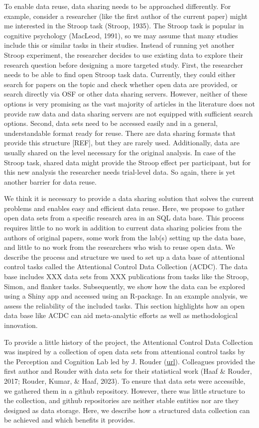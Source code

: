 \documentclass[
  man,floatsintext]{apa6}
\begin{document}
To enable data reuse, data sharing needs to be approached differently. For example, consider a researcher (like the first author of the current paper) might me interested in the Stroop task (Stroop, 1935). The Stroop task is popular in cognitive psychology (MacLeod, 1991), so we may assume that many studies include this or similar tasks in their studies. Instead of running yet another Stroop experiment, the researcher decides to use existing data to explore their research question before designing a more targeted study. First, the researcher needs to be able to find open Stroop task data. Currently, they could either search for papers on the topic and check whether open data are provided, or search directly via OSF or other data sharing servers. However, neither of these options is very promising as the vast majority of articles in the literature does not provide raw data and data sharing servers are not equipped with sufficient search options. Second, data sets need to be accessed easily and in a general, understandable format ready for reuse. There are data sharing formats that provide this structure {[}REF{]}, but they are rarely used. Additionally, data are usually shared on the level necessary for the original analysis. In case of the Stroop task, shared data might provide the Stroop effect per participant, but for this new analysis the researcher needs trial-level data. So again, there is yet another barrier for data reuse.

We think it is necessary to provide a data sharing solution that solves the current problems and enables easy and efficient data reuse. Here, we propose to gather open data sets from a specific research area in an SQL data base. This process requires little to no work in addition to current data sharing policies from the authors of original papers, some work from the lab(s) setting up the data base, and little to no work from the researchers who wish to reuse open data. We describe the process and structure we used to set up a data base of attentional control tasks called the Attentional Control Data Collection (ACDC). The data base includes XXX data sets from XXX publications from tasks like the Stroop, Simon, and flanker tasks. Subsequently, we show how the data can be explored using a Shiny app and accessed using an R-package. In an example analysis, we assess the reliability of the included tasks. This section highlights how an open data base like ACDC can aid meta-analytic efforts as well as methodological innovation.

To provide a little history of the project, the Attentional Control Data Collection was inspired by a collection of open data sets from attentional control tasks by the Perception and Cognition Lab led by J. Rouder (\href{https://github.com/PerceptionCognitionLab/data0}{url}). Colleagues provided the first author and Rouder with data sets for their statistical work (Haaf \& Rouder, 2017; Rouder, Kumar, \& Haaf, 2023). To ensure that data sets were accessible, we gathered them in a github repository. However, there was little structure to the collection, and github repositories are neither stable entities nor are they designed as data storage. Here, we describe how a structured data collection can be achieved and which benefits it provides.
\end{document}
